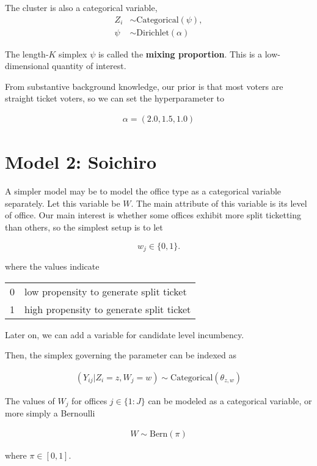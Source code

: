 \documentclass[12pt,letterpaper]{article}
\numberwithin{equation}{section}
\begin{document}
The cluster is also a categorical variable, \begin{align*}
Z_{i} &\sim \text{Categorical}(\psi),\\
\psi &\sim \text{Dirichlet}(\alpha)
\end{align*}

The length-\(K\) simplex \(\psi\) is called the \textbf{mixing
proportion}. This is a low-dimensional quantity of interest.

From substantive background knowledge, our prior is that most voters are
straight ticket voters, so we can set the hyperparameter to

\begin{align*}
\alpha = (2.0, 1.5, 1.0)
\end{align*}

\section{Model 2: Soichiro}

A simpler model may be to model the office type as a categorical
variable separately. Let this variable be \(W\). The main attribute of
this variable is its level of office. Our main interest is whether some
offices exhibit more split ticketting than others, so the simplest setup
is to let

\[w_{j} \in \{0, 1\}.\]

where the values indicate

\begin{table}[!h]
\centering
\begin{tabular}{ll}\toprule
0 & low propensity to generate split ticket\\
1 & high propensity to generate split ticket\\\bottomrule
\end{tabular}
\end{table}

Later on, we can add a variable for candidate level incumbency.

Then, the simplex governing the parameter can be indexed as

\begin{align*}
(Y_{ij} | Z_i = z, W_j = w) \sim \text{Categorical}(\theta_{z, w})
\end{align*}

The values of \(W_j\) for offices \(j \in \{1:J\}\) can be modeled as a
categorical variable, or more simply a Bernoulli

\begin{align*}
W \sim  \text{Bern}(\pi)
\end{align*}

where \(\pi \in [0, 1].\)
\end{document}

